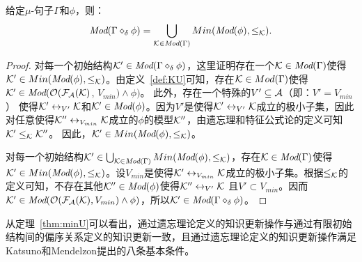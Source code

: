 \begin{theorem}\label{thm:minU}
	给定$\mu$-句子$\Gamma$和$\phi$，则：
	\[\textit{Mod}(\Gamma \diamond_{\delta} \phi) = \bigcup_{{\cal K}\in \textit{Mod}(\Gamma)} Min(\textit{Mod}(\phi), \leq_{{\cal K}}).
	\]
\end{theorem}
\begin{proof}
	对每一个初始结构${\cal K}'\in \textit{Mod}(\Gamma \diamond_{\delta} \phi)$，这里证明存在一个${\cal K} \in \textit{Mod}(\Gamma)$使得${\cal K}' \in  Min(\textit{Mod}(\phi), \leq_{{\cal K}})$。由定义~\ref{def:KU}可知，存在${\cal K}\in Mod(\Gamma)$使得${\cal K}'\in \textit{Mod}({\cal O}({\cal F}_{{\cal A}}({\cal K})$, $V_{min}) \wedge \phi)$。 此外，存在一个特殊的$V'\subseteq {\cal A}$（即：$V' = V_{min}$） 使得${\cal K}' \leftrightarrow_{V'} {\cal K}$和${\cal K}' \in \textit{Mod}(\phi)$。因为$V'$是使得${\cal K}' \leftrightarrow_{V'} {\cal K}$成立的极小子集，因此对任意使得${\cal K}'' \leftrightarrow_{V_{min}} {\cal K}$成立的$\phi$的模型${\cal K}''$，由遗忘理和特征公式论的定义可知${\cal K}' \leq_{{\cal K}} {\cal K}''$。 因此，${\cal K}' \in Min(\textit{Mod}(\phi), \leq_{{\cal K}})$。
	
	对每一个初始结构${\cal K}'\in \bigcup_{{\cal K}\in \textit{Mod}(\Gamma)} Min(\textit{Mod}(\phi), \leq_{{\cal K}})$，存在${\cal K} \in \textit{Mod}(\Gamma)$使得${\cal K}' \in  Min(\textit{Mod}(\phi), \leq_{{\cal K}})$。设$V_{min}$是使得${\cal K}' \leftrightarrow_{V_{min}} {\cal K}$成立的极小子集。根据$\leq_{{\cal K}}$的定义可知，不存在其他${\cal K}''\in \textit{Mod}(\phi)$使得${\cal K}'' \leftrightarrow_{V'} {\cal K}$ 且$V' \subset V_{min}$。因而${\cal K}' \in \textit{Mod}({\cal O}({\cal F}_{{\cal A}}({\cal K}), V_{min}) \wedge \phi)$，所以${\cal K}' \in \textit{Mod}(\Gamma \diamond_{\delta} \phi)$。
\end{proof}

从定理~\ref{thm:minU}可以看出，通过遗忘理论定义的知识更新操作与通过有限初始结构间的偏序关系定义的知识更新一致，且通过遗忘理论定义的知识更新操作满足Katsuno和Mendelzon提出的八条基本条件。

